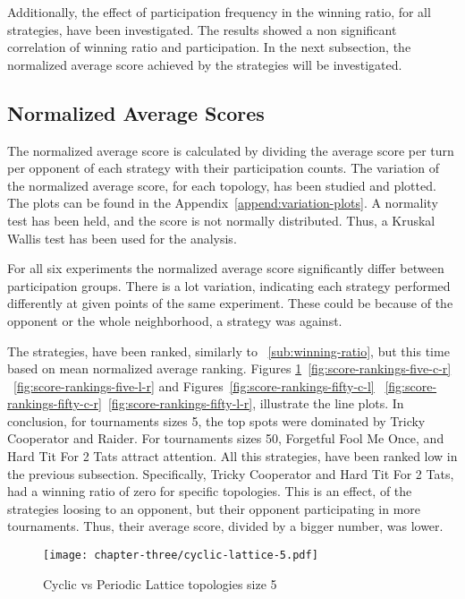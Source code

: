 Additionally, the effect of participation frequency in the winning ratio, for
all strategies, have been investigated. The results showed a non significant
correlation of winning ratio and participation. In the next subsection, the
normalized average score achieved by the strategies will be investigated.

\subsection{Normalized Average Scores}
\label{sub:normalized_av_score}
The normalized average score is calculated by dividing the average score per
turn per opponent of each strategy with their participation counts. The variation
of the normalized average score, for each topology, has been studied and plotted.
The plots can be found in the Appendix~\ref{append:variation-plots}. A normality
test has been held, and the score is not normally distributed. Thus, a Kruskal
Wallis test has been used for the analysis.

For all six experiments the normalized average score significantly differ between
participation groups. There is a lot variation, indicating each strategy performed
differently at given points of the same experiment. These could be because of the
opponent or the whole neighborhood, a strategy was against.

The strategies, have been ranked, similarly to ~\autoref{sub:winning-ratio}, but
this time based on mean normalized average ranking. Figures \ref{fig:score-rankings-five-c-l}~\ref{fig:score-rankings-five-c-r}
~\ref{fig:score-rankings-five-l-r} and Figures~\ref{fig:score-rankings-fifty-c-l}
~\ref{fig:score-rankings-fifty-c-r}~\ref{fig:score-rankings-fifty-l-r}, illustrate
the line plots. In conclusion, for tournaments sizes 5, the top spots were dominated
by Tricky Cooperator and Raider. For tournaments sizes 50, Forgetful Fool Me Once,
and Hard Tit For 2 Tats attract attention. All this strategies, have been ranked
low in the previous subsection. Specifically, Tricky Cooperator and Hard Tit For 2 Tats,
had a winning ratio of zero for specific topologies. This is an effect, of the
strategies loosing to an opponent, but their opponent participating in more
tournaments. Thus, their average score, divided by a bigger number, was lower.

\begin{figure}[H]
	\centering
	\texttt{[image: chapter-three/cyclic-lattice-5.pdf]}
	\caption{Cyclic vs Periodic Lattice topologies size 5}
	\label{fig:score-rankings-five-c-l}
\end{figure}

